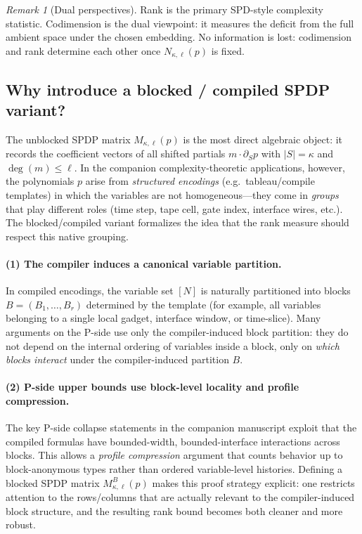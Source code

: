 \documentclass[12pt]{article}
\theoremstyle{definition}
\theoremstyle{remark}
\newtheorem{remark}[theorem]{Remark}
\begin{document}
\begin{remark}[Dual perspectives]
Rank is the primary SPD-style complexity statistic. Codimension is the dual viewpoint:
it measures the deficit from the full ambient space under the chosen embedding.
No information is lost: codimension and rank determine each other once $N_{\kappa,\ell}(p)$
is fixed.
\end{remark}

\subsection{Why introduce a blocked / compiled SPDP variant?}
\label{subsec:why-blocked-spdp}

The unblocked SPDP matrix $M_{\kappa,\ell}(p)$ is the most direct algebraic object:
it records the coefficient vectors of all shifted partials $m\cdot \partial_S p$ with
$|S|=\kappa$ and $\deg(m)\le \ell$.  In the companion complexity-theoretic applications,
however, the polynomials $p$ arise from \emph{structured encodings} (e.g.\ tableau/compile
templates) in which the variables are not homogeneous---they come in \emph{groups} that play
different roles (time step, tape cell, gate index, interface wires, etc.).
The blocked/compiled variant formalizes the idea that the rank measure should respect this
native grouping.

\paragraph{(1) The compiler induces a canonical variable partition.}
In compiled encodings, the variable set $[N]$ is naturally partitioned into blocks
$B=(B_1,\dots,B_r)$ determined by the template (for example, all variables belonging to a
single local gadget, interface window, or time-slice).  Many arguments on the P-side use only
the compiler-induced block partition: they do not depend on the internal ordering of variables inside a block,
only on \emph{which blocks interact} under the compiler-induced partition $B$.

\paragraph{(2) P-side upper bounds use block-level locality and profile compression.}
The key P-side collapse statements in the companion manuscript exploit that the compiled
formulas have bounded-width, bounded-interface interactions across blocks.
This allows a \emph{profile compression} argument that counts behavior up to block-anonymous
types rather than ordered variable-level histories.
Defining a blocked SPDP matrix $M^B_{\kappa,\ell}(p)$ makes this proof strategy explicit:
one restricts attention to the rows/columns that are actually relevant to the compiler-induced
block structure, and the resulting rank bound becomes both cleaner and more robust.
\end{document}
